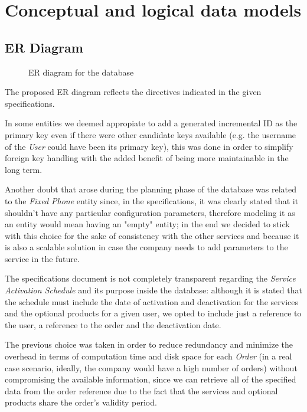 
\chapter{Conceptual and logical data models}
\label{chap:data_models}


\section{ER Diagram}
\label{sec:er_diagram}

\begin{figure}[h]
    \centering
    \centerline{}
    \caption{ER diagram for the database}
    \label{fig:er_diagram}
\end{figure}

The proposed ER diagram reflects the directives indicated in the given specifications.

In some entities we deemed appropiate to add a generated incremental ID as the primary key even if there were other candidate keys available (e.g. the username of the \textit{User} could have been its primary key), this was done in order to simplify foreign key handling with the added benefit of being more maintainable in the long term.

Another doubt that arose during the planning phase of the database was related to the \textit{Fixed Phone} entity since, in the specifications, it was clearly stated that it shouldn't have any particular configuration parameters, therefore modeling it as an entity would mean having an "empty" entity; in the end we decided to stick with this choice for the sake of consistency with the other services and because it is also a scalable solution in case the company needs to add parameters to the service in the future.

The specifications document is not completely transparent regarding the \textit{Service Activation Schedule} and its purpose inside the database: although it is stated that the schedule must include the date of activation and deactivation for the services and the optional products for a given user, we opted to include just a reference to the user, a reference to the order and the deactivation date.

The previous choice was taken in order to reduce redundancy and minimize the overhead in terms of computation time and disk space for each \textit{Order} (in a real case scenario, ideally, the company would have a high number of orders) without compromising the available information, since we can retrieve all of the specified data from the order reference due to the fact that the services and optional products share the order's validity period.

